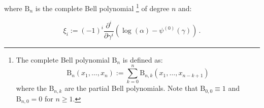 where $\mathrm{B}_{n}$ is the complete Bell polynomial
\footnote{
  The complete Bell polynomial $\mathrm{B}_{n}$ is defined as:
  \begin{equation*}
    \mathrm{B}_{n}(x_{1}, \ldots, x_{n})
    :=
    \sum_{k=0}^{n} \mathrm{B}_{n,k} (x_{1}, \ldots, x_{n-k+1})
  \end{equation*}
  where the $\mathrm{B}_{n,k}$ are the partial Bell polynomials.
  Note that $\mathrm{B}_{0,0} \equiv 1$ and $\mathrm{B}_{n,0} = 0$
  for $n \geq 1$.}
of degree $n$ and:

\begin{equation}
  \xi_{i} := (-1)^{i} \frac{\partial^{i}}{\partial \gamma^{i}}
  \left(\log(\alpha)-\psi^{(0)}(\gamma)\right) \,.
\end{equation}



